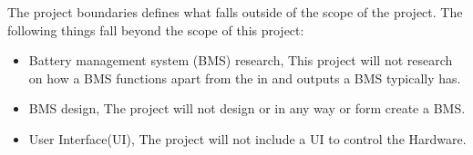 The project boundaries defines what falls outside of the scope of the project.
The following things fall beyond the scope of this project:
\begin{itemize}
    \item Battery management system (BMS) research, This project will not research on how a BMS functions apart from the in and outputs a BMS typically has.
    \item BMS design, The project will not design or in any way or form create a BMS.
    \item User Interface(UI), The project will not include a UI to control the Hardware.
\end{itemize}